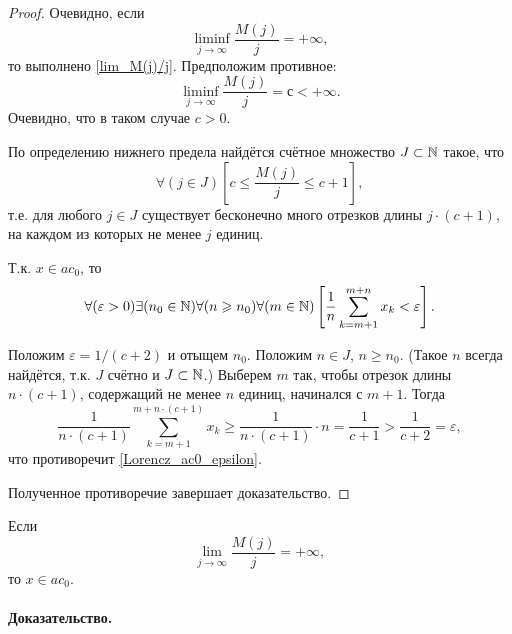 \begin{proof}
Очевидно, если
\begin{equation}
	\liminf_{j \to \infty} \frac{M(j)}{j} = +\infty
	,
\end{equation}
то выполнено \eqref{lim_M(j)/j}.
Предположим противное:
\begin{equation}
	\liminf_{j \to \infty} \frac{M(j)}{j} = с < +\infty
	.
\end{equation}
Очевидно, что в таком случае $c>0$.

По определению нижнего предела найдётся счётное множество
$J\subset\N$ такое, что
\begin{equation}
	\forall(j\in J)\left[c \leq \frac{M(j)}{j} \leq c+1 \right],
\end{equation}
т.е. для любого $j\in J$ существует бесконечно много отрезков длины $j\cdot(c+1)$,
на каждом из которых не менее $j$ единиц.

Т.к. $x\in ac_0$, то
\begin{equation}\label{Lorencz_ac0_epsilon}
	\forall(\varepsilon>0)
	\exists(n_0\in\N)
	\forall(n \geq n_0)
	\forall(m\in\N)
	\left[
		\frac{1}{n} \sum_{k=m+1}^{m+n}x_k < \varepsilon
	\right]
	.
\end{equation}

Положим $\varepsilon = 1/(c+2)$ и отыщем $n_0$.
Положим $n\in J$, $n\geq n_0$.
(Такое $n$ всегда найдётся, т.к. $J$ счётно и $J\subset\N$.)
Выберем $m$ так, чтобы отрезок длины $n\cdot(c+1)$,
содержащий не менее $n$ единиц,
начинался с $m+1$.
Тогда
\begin{equation}
	\frac{1}{n\cdot(c+1)}\sum_{k=m+1}^{m+n\cdot(c+1)}x_k
	\geq
	\frac{1}{n\cdot(c+1)} \cdot n
	=
	\frac{1}{c+1}
	>
	\frac{1}{c+2}
	=
	\varepsilon,
\end{equation}
что противоречит \eqref{Lorencz_ac0_epsilon}.

Полученное противоречие завершает доказательство.
\end{proof}

\begin{lemma}
	\label{thm:lim_M(j)/j_dost}
	Если
	\begin{equation}\label{lim_M(j)/j_dost}
		\lim_{j \to \infty} \frac{M(j)}{j} = +\infty
		,
	\end{equation}
	то $x \in ac_0$.
\end{lemma}

\paragraph{Доказательство.}

